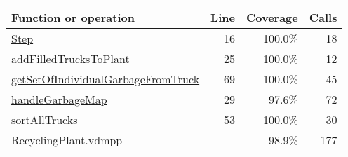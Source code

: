 \bigskip
\begin{longtable}{|l|r|r|r|}
\hline
Function or operation & Line & Coverage & Calls \\
\hline
\hline
\hyperref[Step:16]{Step} & 16&100.0\% & 18 \\
\hline
\hyperref[addFilledTrucksToPlant:25]{addFilledTrucksToPlant} & 25&100.0\% & 12 \\
\hline
\hyperref[getSetOfIndividualGarbageFromTruck:69]{getSetOfIndividualGarbageFromTruck} & 69&100.0\% & 45 \\
\hline
\hyperref[handleGarbageMap:29]{handleGarbageMap} & 29&97.6\% & 72 \\
\hline
\hyperref[sortAllTrucks:53]{sortAllTrucks} & 53&100.0\% & 30 \\
\hline
\hline
RecyclingPlant.vdmpp & & 98.9\% & 177 \\
\hline
\end{longtable}

